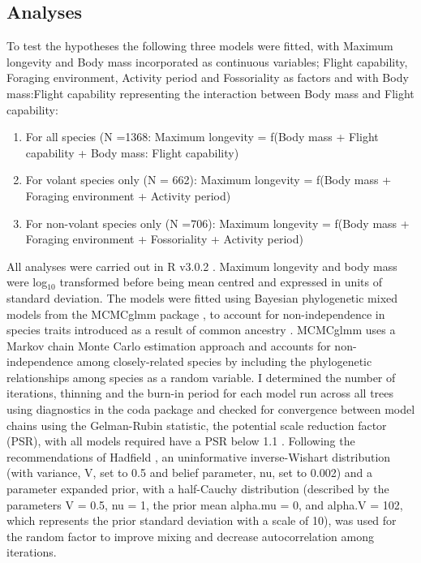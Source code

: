 \subsection{Analyses}

To test the hypotheses the following three models were fitted, with Maximum longevity and Body mass incorporated as continuous variables; Flight capability, Foraging environment, Activity period and Fossoriality as factors and with Body mass:Flight capability representing the interaction between Body mass and Flight capability:


\begin{enumerate}
  \item For all species (N =1368:
Maximum longevity = f(Body mass +  Flight capability + Body mass: Flight capability)
  \item For volant species only (N = 662):
Maximum longevity = f(Body mass + Foraging environment + Activity period)
  \item For non-volant species only (N =706):
Maximum longevity = f(Body mass +  Foraging environment + Fossoriality + Activity period)
\end{enumerate}


All analyses were carried out in R v3.0.2 \citep{RCran}. Maximum longevity and body mass were log$_{10}$ transformed before being mean centred and expressed in units of standard deviation.
The models were fitted using Bayesian phylogenetic mixed models from the MCMCglmm package \citep{hadfield2010mcmc}, to account for non-independence in species traits introduced as a result of common ancestry \citep{harvey1991comparative}. MCMCglmm uses a Markov chain Monte Carlo estimation approach and accounts for non-independence among closely-related species by including the phylogenetic relationships among species as a random variable. I determined the number of iterations, thinning and the burn-in period for each model run across all trees using diagnostics in the coda package \citep{plummer2006coda} and checked for convergence between model chains using the Gelman-Rubin statistic, the potential scale reduction factor (PSR), with all models required have a PSR below  1.1 \citep{gelman1992inference}. Following the recommendations of Hadfield \citep{hadfield2010mcmc}, an uninformative inverse-Wishart distribution (with variance, V, set to 0.5 and belief parameter, nu, set to 0.002) and a parameter expanded prior, with a half-Cauchy distribution (described by the parameters V = 0.5, nu = 1, the prior mean alpha.mu = 0, and alpha.V = 102, which represents the prior standard deviation with a scale of 10), was used for the random factor to improve mixing and decrease autocorrelation among iterations. 

